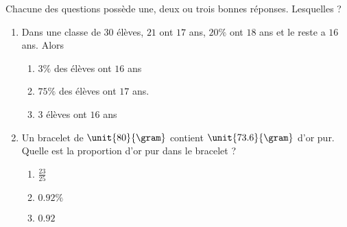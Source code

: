 
\begin{exercice}\label{exoPremiere-0014}

    Chacune des questions possède une, deux ou trois bonnes réponses. Lesquelles ?
    \begin{multicols}{2}
    \begin{enumerate}
        \item
        Dans une classe de \( 30\) élèves, \( 21\) ont \( 17\) ans, \( 20\%\) ont \( 18\) ans et le reste a \( 16\) ans.  Alors
        \begin{enumerate}
            \item

         \( 3\%\) des élèves ont \( 16\) ans
     \item
         \( 75\%\) des élèves ont \( 17\) ans.
     \item
         \( 3\) élèves ont \( 16\) ans
                
        \end{enumerate}
    \item
        Un bracelet de \( \unit{80}{\gram}\) contient \( \unit{73.6}{\gram}\) d'or pur. Quelle est la proportion d'or pur dans le bracelet ?
        \begin{enumerate}
            \item
        \( \frac{ 23 }{ 25 }\)
    \item
        \( 0.92\%\)
    \item
        \( 0.92\)

        \end{enumerate}


\end{enumerate}
\end{multicols}
\end{exercice}
